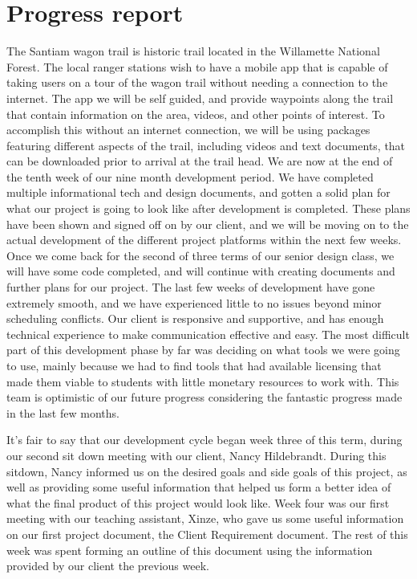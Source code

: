 \documentclass[letterpaper, 10pt,titlepage]{article}
\begin{document}
\section{Progress report}
The Santiam wagon trail is historic trail located in the Willamette National Forest. The local ranger stations wish to have a mobile app that is capable of taking users on a tour of the wagon trail without needing a connection to the internet. The app we will be self guided, and provide waypoints along the trail that contain information on the area, videos, and other points of interest. To accomplish this without an internet connection, we will be using packages featuring different aspects of the trail, including videos and text documents, that can be downloaded prior to arrival at the trail head. We are now at the end of the tenth week of our nine month development period. We have completed multiple informational tech and design documents, and gotten a solid plan for what our project is going to look like after development is completed. These plans have been shown and signed off on by our client, and we will be moving on to the actual development of the different project platforms within the next few weeks. Once we come back for the second of three terms of our senior design class, we will have some code completed, and will continue with creating documents and further plans for our project. 
The last few weeks of development have gone extremely smooth, and we have experienced little to no issues beyond minor scheduling conflicts. Our client is responsive and supportive, and has enough technical experience to make communication effective and easy. The most difficult part of this development phase by far was deciding on what tools we were going to use, mainly because we had to find tools that had available licensing that made them viable to students with little monetary resources to work with. This team is optimistic of our future progress considering the fantastic progress made in the last few months. 

It’s fair to say that our development cycle began week three of this term, during our second sit down meeting with our client, Nancy Hildebrandt. During this sitdown, Nancy informed us on the desired goals and side goals of this project, as well as providing some useful information that helped us form a better idea of what the final product of this project would look like.
Week four was our first meeting with our teaching assistant, Xinze, who gave us some useful information on our first project document, the Client Requirement document. The rest of this week was spent forming an outline of this document using the information provided by our client the previous week.  
\end{document}
